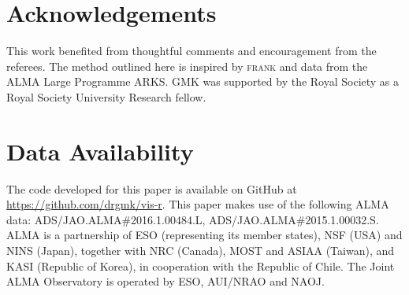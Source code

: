 \documentclass[fleqn,usenatbib]{rasti}
\begin{document}
\section*{Acknowledgements}

This work benefited from thoughtful comments and encouragement from the referees. The method outlined here is inspired by \textsc{frank} \citep{2020MNRAS.tmp.1491J} and data from the ALMA Large Programme ARKS. GMK was supported by the Royal Society as a Royal Society University Research fellow.

\section*{Data Availability}

The code developed for this paper is available on GitHub at \href{https://github.com/drgmk/vis-r}{https://github.com/drgmk/vis-r}. This paper makes use of the following ALMA data: ADS/JAO.ALMA\#2016.1.00484.L, ADS/JAO.ALMA\#2015.1.00032.S. ALMA is a partnership of ESO (representing its member states), NSF (USA) and NINS (Japan), together with NRC (Canada), MOST and ASIAA (Taiwan), and KASI (Republic of Korea), in cooperation with the Republic of Chile. The Joint ALMA Observatory is operated by ESO, AUI/NRAO and NAOJ.







\appendix


\end{document}
